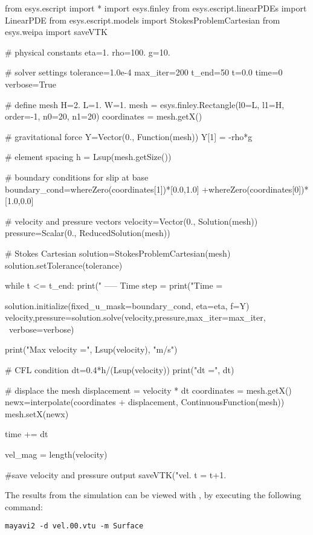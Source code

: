 \begin{python}
  from esys.escript import *
  import esys.finley
  from esys.escript.linearPDEs import LinearPDE
  from esys.escript.models import StokesProblemCartesian
  from esys.weipa import saveVTK

  # physical constants
  eta=1.
  rho=100.
  g=10.

  # solver settings
  tolerance=1.0e-4
  max_iter=200
  t_end=50
  t=0.0
  time=0
  verbose=True

  # define mesh
  H=2.
  L=1.
  W=1.
  mesh = esys.finley.Rectangle(l0=L, l1=H, order=-1, n0=20, n1=20)
  coordinates = mesh.getX()

  # gravitational force
  Y=Vector(0., Function(mesh))
  Y[1] = -rho*g

  # element spacing
  h = Lsup(mesh.getSize())

  # boundary conditions for slip at base
  boundary_cond=whereZero(coordinates[1])*[0.0,1.0]
      +whereZero(coordinates[0])*[1.0,0.0]

  # velocity and pressure vectors
  velocity=Vector(0., Solution(mesh))
  pressure=Scalar(0., ReducedSolution(mesh))

  # Stokes Cartesian
  solution=StokesProblemCartesian(mesh)
  solution.setTolerance(tolerance)

  while t <= t_end:
    print(" ----- Time step = %
    print("Time = %

    solution.initialize(fixed_u_mask=boundary_cond, eta=eta, f=Y)
    velocity,pressure=solution.solve(velocity,pressure,max_iter=max_iter, \
                                     verbose=verbose)

    print("Max velocity =", Lsup(velocity), "m/s")

    # CFL condition
    dt=0.4*h/(Lsup(velocity))
    print("dt =", dt)

    # displace the mesh
    displacement = velocity * dt
    coordinates = mesh.getX()
    newx=interpolate(coordinates + displacement, ContinuousFunction(mesh))
    mesh.setX(newx)

    time += dt

    vel_mag = length(velocity)

    #save velocity and pressure output
    saveVTK("vel.%
    t = t+1.
\end{python}
%
The results from the simulation can be viewed with \mayavi, by executing the
following command:
\begin{verbatim}
mayavi2 -d vel.00.vtu -m Surface
\end{verbatim}
